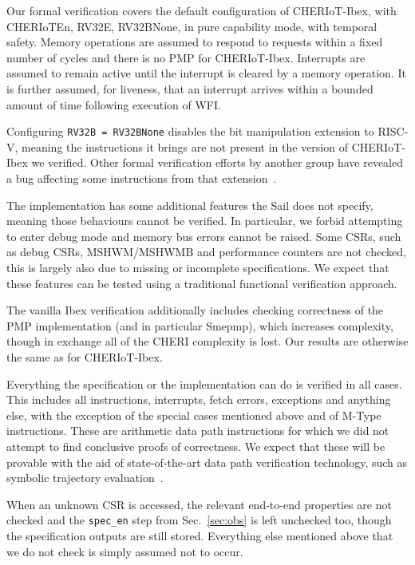 \documentclass[10pt,conference]{IEEEtran}
\begin{document}
Our formal verification covers the default configuration of CHERIoT-Ibex,
with CHERIoTEn, RV32E, RV32BNone, in pure capability mode, with temporal safety.
Memory operations are assumed to respond to requests within a fixed number of
cycles and there is no PMP for CHERIoT-Ibex.  Interrupts are assumed to remain active until
the interrupt is cleared by a memory operation. It is further assumed, for
liveness, that an interrupt arrives within a bounded amount of time
following execution of WFI.

Configuring \verb|RV32B = RV32BNone| disables the bit manipulation extension
to RISC-V, meaning the instructions it brings are not present in the version
of CHERIoT-Ibex we verified. Other formal verification efforts by another group have
revealed a bug affecting some instructions from that extension~\cite{CHERIoT-Ibex-issues}.

The implementation has some additional features the Sail does not specify,
meaning those behaviours cannot be verified. In particular, we forbid
attempting to enter debug mode and memory bus errors cannot be raised. Some CSRs, such as
debug CSRs, MSHWM/MSHWMB and performance counters are not checked, this is largely
also due to missing or incomplete specifications.
We expect that these features can be tested using a traditional functional verification approach.

The vanilla Ibex verification additionally includes checking correctness
of the PMP implementation (and in particular Smepmp), which increases
complexity, though in exchange all of the CHERI complexity is lost.
Our results are otherwise the same as for CHERIoT-Ibex.

Everything the specification or the implementation can do is verified in all cases.
This includes all instructions, interrupts, fetch errors, exceptions and anything
else, with the exception of the special cases mentioned above and of M-Type instructions.
These are arithmetic data path instructions for which we did not attempt to find
conclusive proofs of correctness. We expect that these will be
provable with the aid of state-of-the-art data path verification
technology, such as symbolic trajectory evaluation~\cite{Seger:2005:IEE}.

When an unknown CSR is accessed, the relevant end-to-end properties
are not checked and the \verb|spec_en| step from Sec.~\ref{sec:obs}
is left unchecked too, though the specification outputs are still stored.
Everything else mentioned above that we do not check is simply assumed not to
occur.
\end{document}
